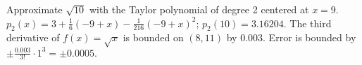 {Approximate $\sqrt{10}$ with the Taylor polynomial of degree 2 centered at $x=9$.
}
{$p_2(x) =3+\frac{1}{6} (-9+x)-\frac{1}{216} (-9+x)^2$; $p_2(10) =  3.16204$. The third derivative of $f(x) =\sqrt x$ is bounded on $(8,11)$ by $0.003$. Error is bounded by $\pm \frac{0.003}{3!}\cdot1^3 = \pm 0.0005.$
}